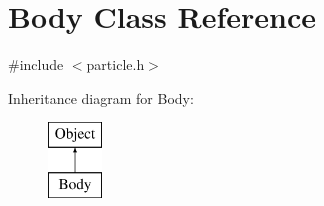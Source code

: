 \hypertarget{classBody}{}\section{Body Class Reference}
\label{classBody}


{\ttfamily \#include $<$particle.\+h$>$}

Inheritance diagram for Body\+:\begin{figure}[H]
\begin{center}
\leavevmode
\includegraphics[height=2.000000cm]{classBody}
\end{center}
\end{figure}
